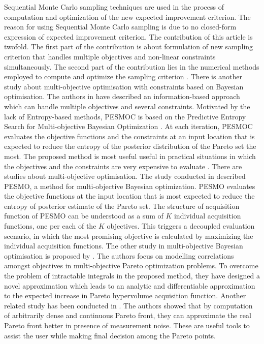 Sequential Monte Carlo sampling techniques are used in the process of computation and optimization of the new expected improvement criterion. The reason for using Sequential Monte Carlo sampling  is due to no closed-form expression of expected improvement criterion.
The contribution of this article is twofold. The first part of the contribution is about formulation of new sampling criterion that handles multiple objectives and non-linear constraints simultaneously.  The second part of the contribution lies in the numerical methods employed to compute and optimize the sampling criterion \cite{feliot2017bayesian}. 
There is another study about multi-objective optimisation with constraints based on Bayesian optimisation. The authors in \cite{garrido2016predictive} have described an information-based approach which can handle multiple objectives and several constraints. Motivated by the lack of Entropy-based methods, PESMOC is based on the Predictive Entropy Search for Multi-objective Bayesian Optimization \cite{hernandez2016predictive}. At each iteration, PESMOC evaluates the objective functions and the constraints at an input location that is expected to reduce the entropy of the posterior distribution of the Pareto set the most. The proposed method is most useful useful in practical situations in which the objectives and the constraints are very
expensive to evaluate \cite{garrido2016predictive}.
There are studies about multi-objective optimisation. The study conducted in \cite{hernandez2016predictive} described PESMO, a method for multi-objective Bayesian optimization. PESMO evaluates the objective functions at the input location that is most expected to reduce the entropy of posterior estimate of the Pareto set. The structure of acquisition function of PESMO can be understood as a sum of $K$ individual acquisition functions, one per each of the $K$ objectives. This triggers a decoupled evaluation scenario, in which the most promising objective is calculated by maximizing the individual acquisition functions.
The other study in multi-objective Bayesian optimisation is proposed by \cite{shah2016pareto}. The authors focus on modelling correlations amongst
objectives in multi-objective Pareto optimization problems. To overcome the problem of intractable integrals in the proposed method, they have designed a novel approximation which leads to an analytic and differentiable approximation to the expected increase in Pareto hypervolume acquisition function.
Another related study has been conducted in \cite{calandra2014pareto}. The authors showed that by computation of arbitrarily dense and continuous Pareto front, they can approximate the real Pareto front better in presence of measurement noise. These are useful tools to assist the user while making final decision among the Pareto points.
